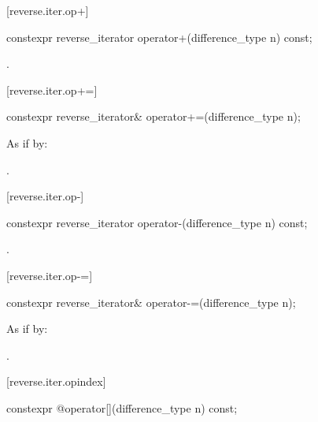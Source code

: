 [reverse.iter.op+]{}

%
\begin{itemdecl}
constexpr reverse_iterator operator+(difference_type n) const;
\end{itemdecl}

\begin{itemdescr}
\pnum
\returns
{}.
\end{itemdescr}

[reverse.iter.op+=]{}

%
\begin{itemdecl}
constexpr reverse_iterator& operator+=(difference_type n);
\end{itemdecl}

\begin{itemdescr}
\pnum
\effects
As if by: 

\pnum
\returns
{}.
\end{itemdescr}

[reverse.iter.op-]{}

%
\begin{itemdecl}
constexpr reverse_iterator operator-(difference_type n) const;
\end{itemdecl}

\begin{itemdescr}
\pnum
\returns
{}.
\end{itemdescr}

[reverse.iter.op-=]{}

%
\begin{itemdecl}
constexpr reverse_iterator& operator-=(difference_type n);
\end{itemdecl}

\begin{itemdescr}
\pnum
\effects
As if by: 

\pnum
\returns
{}.
\end{itemdescr}

[reverse.iter.opindex]{}

%
\begin{itemdecl}
constexpr @\unspec@ operator[](difference_type n) const;
\end{itemdecl}

